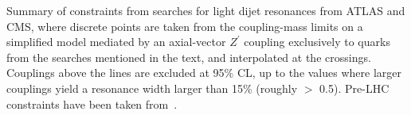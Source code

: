 Summary of constraints from searches for light dijet resonances from ATLAS and CMS, where discrete points are taken from the coupling-mass limits on a simplified model mediated by an axial-vector $Z^\prime$ coupling exclusively to quarks from the searches mentioned in the text, and interpolated at the crossings. Couplings above the lines are excluded at 95\% CL, up to the values where larger couplings yield a resonance width larger than 15\% (roughly \gq $>$ 0.5).  
Pre-LHC constraints have been taken from~\cite{Dobrescu:2013coa}.